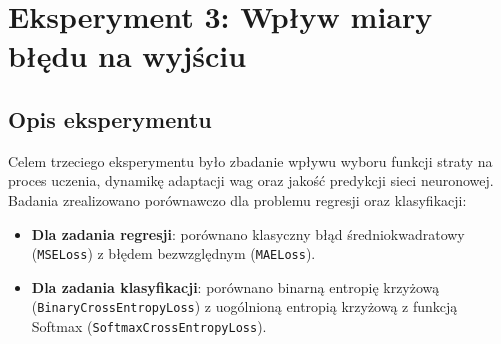 \documentclass[11pt,a4paper]{article}
\begin{document}
\section{Eksperyment 3: Wpływ miary błędu na wyjściu}
\label{sec:exp_loss_functions}

\subsection{Opis eksperymentu}
Celem trzeciego eksperymentu było zbadanie wpływu wyboru funkcji straty na proces uczenia, dynamikę adaptacji wag oraz jakość predykcji sieci neuronowej. Badania zrealizowano porównawczo dla problemu regresji oraz klasyfikacji:
\begin{itemize}
    \item \textbf{Dla zadania regresji}: porównano klasyczny błąd średniokwadratowy (\texttt{MSELoss}) z błędem bezwzględnym (\texttt{MAELoss}).
    \item \textbf{Dla zadania klasyfikacji}: porównano binarną entropię krzyżową (\texttt{BinaryCrossEntropyLoss}) z uogólnioną entropią krzyżową z funkcją Softmax (\texttt{SoftmaxCrossEntropyLoss}).
\end{itemize}
\end{document}
